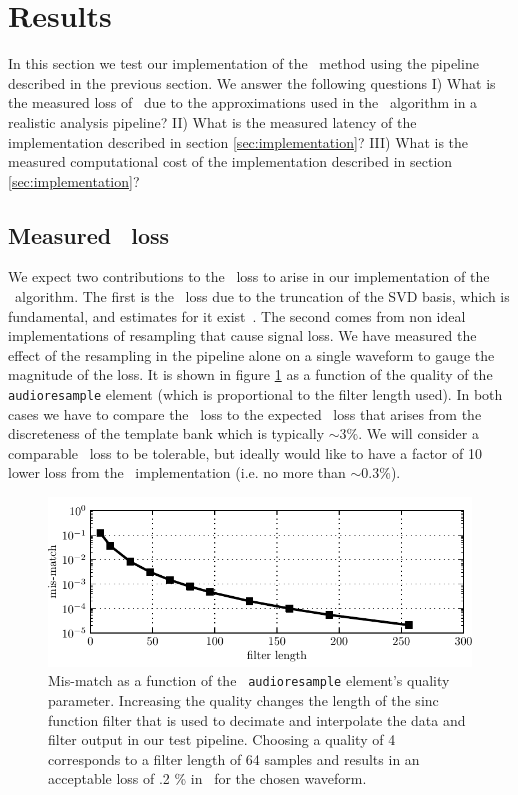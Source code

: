 \section{Results}
\label{SECIV}\label{sec:results}

In this section we test our implementation of the \lloid\ method using the
pipeline described in the previous section.  We answer the following questions
%
I) What is the measured loss of \SNR\ due to the approximations used in the
\lloid\ algorithm in a realistic analysis pipeline?
%
II) What is the measured latency of the implementation described in section
\ref{sec:implementation}?
%
III) What is the measured computational cost of the implementation described in
section \ref{sec:implementation}?

\subsection{Measured \SNR\ loss}

We expect two contributions to the \SNR\ loss to arise in our implementation of
the \lloid\ algorithm.  The first is the \SNR\ loss due to the truncation of
the SVD basis, which is fundamental, and estimates for it
exist~\cite{Cannon:2010p10398}.  The second comes from non ideal
implementations of resampling that cause signal loss.  We have measured the
effect of the resampling in the pipeline alone on a single waveform to gauge
the magnitude of the loss.  It is shown in figure \ref{fig:resamp_mm} as a
function of the quality of the {\tt audioresample} element (which is
proportional to the filter length used).  In both cases we have to compare the
\SNR\ loss to the expected \SNR\ loss that arises from the discreteness of the
template bank which is typically $\sim 3\%$.  We will consider a comparable
\SNR\ loss to be tolerable, but ideally would like to have a factor of 10 lower
loss from the \lloid\ implementation (i.e. no more than $\sim 0.3 \%$).  
%
\begin{figure}
\includegraphics{resamp_mm.pdf}
\caption{\label{fig:resamp_mm}Mis-match as a function of the {\tt
audioresample} element's quality parameter.  Increasing the quality changes the
length of the sinc function filter that is used to decimate and interpolate the
data and filter output in our test pipeline.  Choosing a quality of 4
corresponds to a filter length of 64 samples and results in an acceptable loss
of .2 \% in \SNR\ for the chosen waveform.}
\end{figure}


